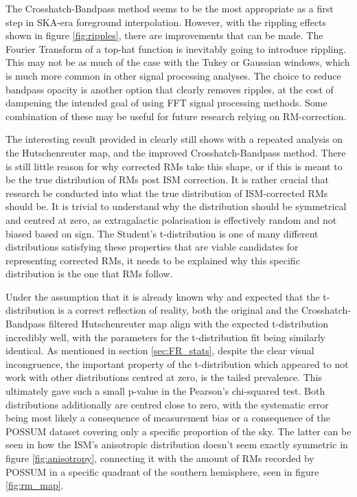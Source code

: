 The Crosshatch-Bandpass method seems to be the most appropriate as a first step in SKA-era foreground interpolation. However, with the rippling effects shown in figure \ref{fig:ripples}, there are improvements that can be made. The Fourier Transform of a top-hat function is inevitably going to introduce rippling. This may not be as much of the case with the Tukey or Gaussian windows, which is much more common in other signal processing analyses. The choice to reduce bandpass opacity is another option that clearly removes ripples, at the cost of dampening the intended goal of using FFT signal processing methods. Some combination of these may be useful for future research relying on RM-correction.


The interesting result provided in \cite{ID73} clearly still shows with a repeated analysis on the Hutschenreuter map, and the improved Crosshatch-Bandpass method. There is still little reason for why corrected RMs take this shape, or if this is meant to be the true distribution of RMs post ISM correction. It is rather crucial that research be conducted into what the true distribution of ISM-corrected RMs should be. It is trivial to understand why the distribution should be symmetrical and centred at zero, as extragalactic polarisation is effectively random and not biased based on sign. The Student's t-distribution is one of many different distributions satisfying these properties that are viable candidates for representing corrected RMs, it needs to be explained why this specific distribution is the one that RMs follow.


Under the assumption that it is already known why and expected that the t-distribution is a correct reflection of reality, both the original and the Crosshatch-Bandpass filtered Hutschenreuter map align with the expected t-distribution incredibly well, with the parameters for the t-distribution fit being similarly identical. As mentioned in section \ref{sec:FR_stats}, despite the clear visual incongruence, the important property of the t-distribution which appeared to not work with other distributions centred at zero, is the tailed prevalence. This ultimately gave such a small p-value in the Pearson's chi-squared test. Both distributions additionally are centred close to zero, with the systematic error being most likely a consequence of measurement bias or a consequence of the POSSUM dataset covering only a specific proportion of the sky. The latter can be seen in how the ISM's anisotropic distribution doesn't seem exactly symmetric in figure \ref{fig:anisotropy}, connecting it with the amount of RMs recorded by POSSUM in a specific quadrant of the southern hemisphere, seen in figure \ref{fig:rm_map}.


